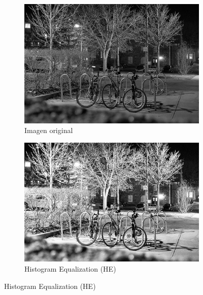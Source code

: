 \documentclass[sigchi]{acmart}
\begin{document}
\begin{figure}[htbp]
	\centering

	\begin{subfigure}[b]{0.32\textwidth}
		\centering
		\includegraphics[width=\linewidth]{./procesadas/2015_00002/2015_00002_original.png}
		\caption{Imagen original}
	\end{subfigure}
	\hfill
	\begin{subfigure}[b]{0.32\textwidth}
		\centering
		\includegraphics[width=\linewidth]{./procesadas/2015_00002/2015_00002_he.png}
		\caption{Histogram Equalization (HE)}
	\end{subfigure}


\end{figure}
\end{document}
